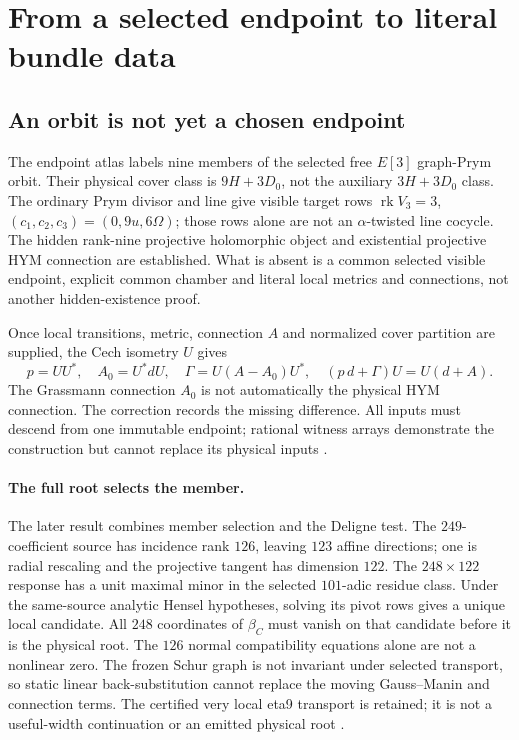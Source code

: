 \documentclass[11pt]{article}
\begin{document}
\section{From a selected endpoint to literal bundle data}
\label{sec:endpoint-descent}

\subsection{An orbit is not yet a chosen endpoint}
\label{sec:fsb03f}
The endpoint atlas labels nine members of the selected free $E[3]$ graph-Prym
orbit. Their physical cover class is $9H+3D_0$, not the auxiliary
$3H+3D_0$ class. The ordinary Prym divisor and line give visible target rows
$\operatorname{rk}V_3=3$, $(c_1,c_2,c_3)=(0,9u,6\Omega)$; those rows alone
are not an $\alpha$-twisted line cocycle. The hidden rank-nine projective
holomorphic object and existential projective HYM connection are established.
What is absent is a common selected visible endpoint, explicit common chamber
and literal local metrics and connections, not another hidden-existence proof.

Once local transitions, metric, connection $A$ and normalized cover partition
are supplied, the Cech isometry $U$ gives
\[
 p=UU^*,\quad A_0=U^*dU,\quad
 \Gamma=U(A-A_0)U^*,\quad (p\,d+\Gamma)U=U(d+A).
\]
The Grassmann connection $A_0$ is not automatically the physical HYM
connection. The correction records the missing difference. All inputs must
descend from one immutable endpoint; rational witness arrays demonstrate the
construction but cannot replace its physical inputs \cite{FSB03f}.

\paragraph{The full root selects the member.}\label{sec:fsb03g}
The later result combines member selection and the Deligne test. The
$249$-coefficient source has incidence rank $126$, leaving $123$ affine
directions; one is radial rescaling and the projective tangent has dimension
$122$. The $248\times122$ response has a unit maximal minor in the selected
$101$-adic residue class. Under the same-source analytic Hensel hypotheses,
solving its pivot rows gives a unique local candidate. All $248$ coordinates
of $\beta_C$ must vanish on that candidate before it is the physical root.
The $126$ normal compatibility equations alone are not a nonlinear zero.
The frozen Schur graph is not invariant under selected transport, so static
linear back-substitution cannot replace the moving Gauss--Manin and
connection terms. The certified very local eta9 transport is retained; it is
not a useful-width continuation or an emitted physical root \cite{FSB03g}.
\end{document}
